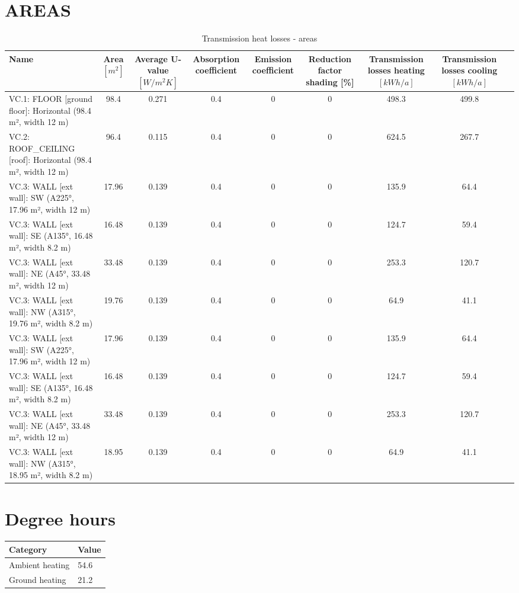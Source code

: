 \documentclass{article}
\begin{document}
\section*{AREAS}
\begin{table}[h!]
    \centering
    \caption{Transmission heat losses - areas}
    \begin{tabular}{@{}lcccccccc@{}}
        \toprule
        Name & Area $[m^2]$ & Average U-value $[W/m^2K]$ & Absorption coefficient & Emission coefficient & Reduction factor shading [\%] & Transmission losses heating $[kWh/a]$ & Transmission losses cooling $[kWh/a]$ \\
        \midrule
        VC.1: FLOOR [ground floor]: Horizontal (98.4 m², width 12 m) & 98.4 & 0.271 & 0.4 & 0 & 0 & 498.3 & 499.8 \\
        VC.2: ROOF\_CEILING [roof]: Horizontal (98.4 m², width 12 m) & 96.4 & 0.115 & 0.4 & 0 & 0 & 624.5 & 267.7 \\
        VC.3: WALL [ext wall]: SW (A225°, 17.96 m², width 12 m) & 17.96 & 0.139 & 0.4 & 0 & 0 & 135.9 & 64.4 \\
        VC.3: WALL [ext wall]: SE (A135°, 16.48 m², width 8.2 m) & 16.48 & 0.139 & 0.4 & 0 & 0 & 124.7 & 59.4 \\
        VC.3: WALL [ext wall]: NE (A45°, 33.48 m², width 12 m) & 33.48 & 0.139 & 0.4 & 0 & 0 & 253.3 & 120.7 \\
        VC.3: WALL [ext wall]: NW (A315°, 19.76 m², width 8.2 m) & 19.76 & 0.139 & 0.4 & 0 & 0 & 64.9 & 41.1 \\
        VC.3: WALL [ext wall]: SW (A225°, 17.96 m², width 12 m) & 17.96 & 0.139 & 0.4 & 0 & 0 & 135.9 & 64.4 \\
        VC.3: WALL [ext wall]: SE (A135°, 16.48 m², width 8.2 m) & 16.48 & 0.139 & 0.4 & 0 & 0 & 124.7 & 59.4 \\
        VC.3: WALL [ext wall]: NE (A45°, 33.48 m², width 12 m) & 33.48 & 0.139 & 0.4 & 0 & 0 & 253.3 & 120.7 \\
        VC.3: WALL [ext wall]: NW (A315°, 18.95 m², width 8.2 m) & 18.95 & 0.139 & 0.4 & 0 & 0 & 64.9 & 41.1 \\
        \bottomrule
    \end{tabular}
\end{table}

\section*{Degree hours}
\begin{table}[h!]
    \centering
    \begin{tabular}{@{}ll@{}}
        \toprule
        Category & Value \\
        \midrule
        Ambient heating & 54.6 \\
        Ground heating & 21.2 \\
        \bottomrule
    \end{tabular}
\end{table}
\end{document}
